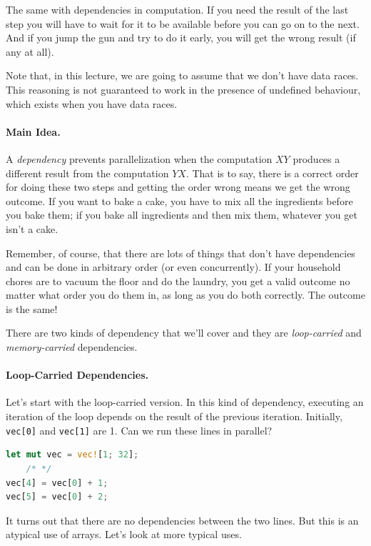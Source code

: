 \documentclass[a4paper]{report}
\begin{document}
The same with dependencies in computation. If you need the result of the last step you will have to wait for it to be available before you can go on to the next. And if you jump the gun and try to do it early, you will get the wrong result (if any at all). 

Note that, in this lecture, we are going to assume that we don't have data races. This reasoning is not guaranteed to work in the presence of undefined behaviour, which exists when you have data races.

\paragraph{Main Idea.} A \emph{dependency} prevents parallelization
when the computation $XY$ produces a different result from the
computation $YX$. That is to say, there is a correct order for doing these two steps and getting the order wrong means we get the wrong outcome. If you want to bake a cake, you have to mix all the ingredients before you bake them; if you bake all ingredients and then mix them, whatever you get isn't a cake.

Remember, of course, that there are lots of things that don't have dependencies and can be done in arbitrary order (or even concurrently). If your household chores are to vacuum the floor and do the laundry, you get a valid outcome no matter what order you do them in, as long as you do both correctly. The outcome is the same!

There are two kinds of dependency that we'll cover and they are \emph{loop-carried} and \emph{memory-carried} dependencies.

\paragraph{Loop-Carried Dependencies.} Let's start with the loop-carried version. In this kind of dependency, executing an iteration of the loop depends on the result of the previous iteration. Initially, {\tt vec[0]} and {\tt vec[1]} are 1. Can we run these lines in parallel?

\begin{lstlisting}[language=Rust]
let mut vec = vec![1; 32];
    /* */
vec[4] = vec[0] + 1;
vec[5] = vec[0] + 2;
\end{lstlisting}


It turns out that there are no dependencies between the two lines. But this is
an atypical use of arrays. Let's look at more typical uses.
\end{document}
